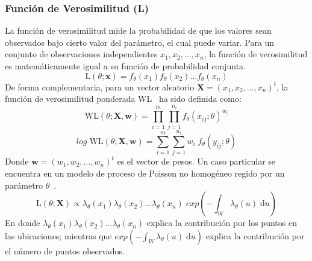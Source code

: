 \subsubsection{Función de Verosimilitud (L)}
La función de verosimilitud mide la probabilidad de que los valores sean observados bajo cierto valor del parámetro, el cual puede variar. Para un conjunto de observaciones independientes $x_1, x_2, \dots, x_n$, la función de verosimilitud es matemáticamente igual a su función de probabilidad conjunta.
\begin{equation}
    \mathrm{L}(\theta; \textbf{x}) = f_\theta(x_1) f_\theta(x_2) \dots f_\theta(x_n)
\end{equation}
De forma complementaria, para un vector aleatorio $\textbf{X} = (x_1, x_2, \dots, x_n)^t$, la función de verosimilitud ponderada WL~\cite{wang2001maximum} ha sido definida como:
\begin{equation}
	\mathrm{WL}(\theta; \textbf{X},\textbf{w}) = \prod_{i=1}^m \prod_{j=1}^{n_i} f_\theta(x_{ij};\theta)^{w_i}
\end{equation}
\begin{equation}
    log \; \mathrm{WL}(\theta; \textbf{X},\textbf{w}) = \sum_{i=1}^m \sum_{j=1}^{n_i} w_i \; f_\theta(y_{ij};\theta)
\end{equation}
Donde $\textbf{w}=(w_1, w_2, \dots, w_n)^t$ es el vector de pesos.
\newpage
Un caso particular se encuentra en un modelo de proceso de Poisson no homogéneo regido por un parámetro $\theta$~\cite{baddeley2015spatial}.
\begin{equation}
    \mathrm{L}(\theta; \textbf{X}) \propto \lambda_\theta(x_1) \lambda_\theta(x_2) \dots \lambda_\theta(x_n) \; exp\left( - \int_W \lambda_\theta(u) \; \mathrm{d} u \right)
\end{equation}
En donde $\lambda_\theta(x_1) \lambda_\theta(x_2) \dots \lambda_\theta(x_n)$ explica la contribución por los puntos en las ubicaciones; mientras que $exp\left( - \int_W \lambda_\theta(u) \; \mathrm{d} u \right)$ explica la contribución por el número de puntos observados. 

